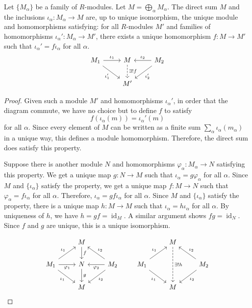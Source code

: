 \documentclass[a4paper,11pt]{article}
\begin{document}
    \begin{proposition}
      Let \(\{M_\alpha\}\) be a family of \(R\)-modules. Let \(M = \bigoplus_\alpha M_\alpha\). The direct sum \(M\) and the inclusions \(\iota_\alpha: M_\alpha \to M\) are, up to unique isomorphism, the unique module and homomorphisms satisfying: for all \(R\)-modules \(M'\) and families of homomorphisms \(\iota_\alpha': M_\alpha \to M'\), there exists a unique homomorphism \(f: M \to M'\) such that \(\iota_\alpha' = f \iota_\alpha\) for all \(\alpha\).
      \[
        \begin{tikzcd}
          M_1 \arrow[r,"\iota_1"] \arrow[dr,"\iota_1'"'] & M \arrow[d,"\exists!f",dashed] & M_2 \arrow[l,"\iota_2"'] \arrow[dl,"\iota_2'"] \\
          {} & M' & {}
        \end{tikzcd}
      \]
    \end{proposition}
    \begin{proof}
      Given such a module \(M'\) and homomorphisms \(\iota_\alpha'\), in order that the diagram commute, we have no choice but to define \(f\) to satisfy
      \[
        f(\iota_\alpha(m)) = \iota_\alpha'(m)
      \]
      for all \(\alpha\). Since every element of \(M\) can be written as a finite sum \(\sum_\alpha \iota_\alpha(m_\alpha)\) in a unique way, this defines a module homomorphism. Therefore, the direct sum does satisfy this property. 

      Suppose there is another module \(N\) and homomorphisms \(\varphi_\alpha: M_\alpha \to N\) satisfying this property. We get a unique map \(g: N \to M\) such that \(\iota_\alpha = g \varphi_\alpha\) for all \(\alpha\). Since \(M\) and \(\{\iota_\alpha\}\) satisfy the property, we get a unique map \(f: M \to N\) such that \(\varphi_\alpha = f \iota_\alpha\) for all \(\alpha\). Therefore, \(\iota_\alpha = g f \iota_\alpha\) for all \(\alpha\). Since \(M\) and \(\{\iota_\alpha\}\) satisfy the property, there is a unique map \(h: M \to M\) such that \(\iota_\alpha = h \iota_\alpha\) for all \(\alpha\). By uniqueness of \(h\), we have \(h = gf = \operatorname{id}_M\). A similar argument shows \(fg = \operatorname{id}_N\). Since \(f\) and \(g\) are unique, this is a unique isomorphism.

      \[
        \begin{tikzcd}
          {} & M \arrow[d,"f"] & {} \\
          M_1 \arrow[ur,"\iota_1"] \arrow[r,"\varphi_1"'] \arrow[dr,"\iota_1"'] & N \arrow[d,"g"] & M_2 \arrow[ul,"\iota_2"'] \arrow[l,"\varphi_2"] \arrow[dl,"\iota_2"] \\
          {} & M & {}
        \end{tikzcd} \qquad
        \begin{tikzcd}
          {} & M \arrow[dd,"\exists!h",dashed] & {} \\
          M_1 \arrow[ur,"\iota_1"] \arrow[dr,"\iota_1"'] & {} & M_2 \arrow[ul,"\iota_2"'] \arrow[dl,"\iota_2"] \\
          {} & M & {}
        \end{tikzcd}
      \]
    \end{proof}
\end{document}
